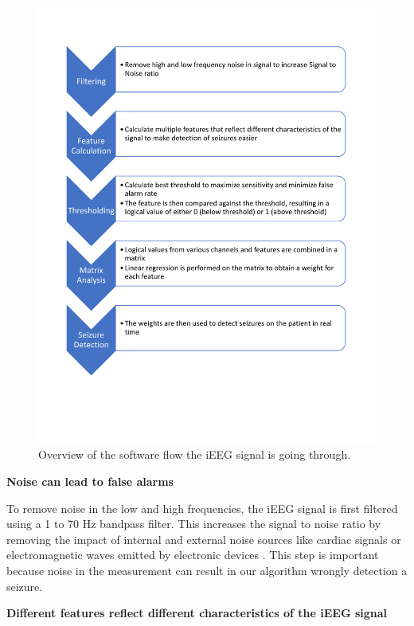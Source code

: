 \documentclass[usletter, 11pt]{extarticle}
\begin{document}
\begin{figure}[p]
	\centering
	\includegraphics[width = \textwidth]{img/Round6_SoftwareDiagram}
	\caption{Overview of the software flow the iEEG signal is going through.}
	\label{fig:software_diagram}
\end{figure}

\vspace{11pt}
\textbf{Noise can lead to false alarms}

To remove noise in the low and high frequencies, the iEEG signal is first filtered using a 1 to 70 Hz bandpass filter. This increases the signal to noise ratio by removing the impact of internal and external noise sources like cardiac signals or electromagnetic waves emitted by electronic devices \cite{repovs2010}. This step is important because noise in the measurement can result in our algorithm wrongly detection a seizure. 

\vspace{11pt}
\textbf{Different features reflect different characteristics of the iEEG signal}
\end{document}

